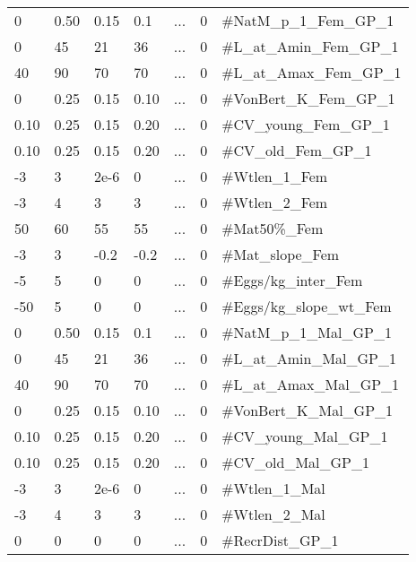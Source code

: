 \begin{longtable}{p{1.1cm} p{1.1cm} p{1.1cm}  p{1.1cm}  p{1.5cm}  p{1.1cm}  p{6.75cm}  }
	0    & 0.50 & 0.15 & 0.1  & \multicolumn{1}{c}{...} & 0 & \#NatM\_p\_1\_Fem\_GP\_1\Tstrut\\
	0    & 45   & 21   & 36   & \multicolumn{1}{c}{...} & 0 & \#L\_at\_Amin\_Fem\_GP\_1 \\
	40   & 90   & 70   & 70   & \multicolumn{1}{c}{...} & 0 & \#L\_at\_Amax\_Fem\_GP\_1 \\
	0    & 0.25 & 0.15 & 0.10 & \multicolumn{1}{c}{...} & 0 & \#VonBert\_K\_Fem\_GP\_1 \\
	0.10 & 0.25 & 0.15 & 0.20 & \multicolumn{1}{c}{...} & 0 & \#CV\_young\_Fem\_GP\_1 \\
	0.10 & 0.25 & 0.15 & 0.20 & \multicolumn{1}{c}{...} & 0 & \#CV\_old\_Fem\_GP\_1 \\
	-3   & 3    & 2e-6 & 0    & \multicolumn{1}{c}{...} & 0 & \#Wtlen\_1\_Fem \\
	-3   & 4    & 3    & 3    & \multicolumn{1}{c}{...} & 0 & \#Wtlen\_2\_Fem \\
	50   & 60   & 55   & 55   & \multicolumn{1}{c}{...} & 0 & \#Mat50\%\_Fem  \\
	-3   & 3    & -0.2 & -0.2 & \multicolumn{1}{c}{...} & 0 & \#Mat\_slope\_Fem \\
	-5   & 5    & 0    & 0    & \multicolumn{1}{c}{...} & 0 & \#Eggs/kg\_inter\_Fem \\
	-50  & 5    & 0    & 0    & \multicolumn{1}{c}{...} & 0 & \#Eggs/kg\_slope\_wt\_Fem \\
	0    & 0.50 & 0.15 & 0.1  & \multicolumn{1}{c}{...} & 0 & \#NatM\_p\_1\_Mal\_GP\_1\\
	0    & 45   & 21   & 36   & \multicolumn{1}{c}{...} & 0 & \#L\_at\_Amin\_Mal\_GP\_1 \\
	40   & 90   & 70   & 70   & \multicolumn{1}{c}{...} & 0 & \#L\_at\_Amax\_Mal\_GP\_1 \\
	0    & 0.25 & 0.15 & 0.10 & \multicolumn{1}{c}{...} & 0 & \#VonBert\_K\_Mal\_GP\_1 \\
	0.10 & 0.25 & 0.15 & 0.20 & \multicolumn{1}{c}{...} & 0 & \#CV\_young\_Mal\_GP\_1 \\
	0.10 & 0.25 & 0.15 & 0.20 & \multicolumn{1}{c}{...} & 0 & \#CV\_old\_Mal\_GP\_1 \\
	-3   & 3    & 2e-6 & 0    & \multicolumn{1}{c}{...} & 0 & \#Wtlen\_1\_Mal \\
	-3   & 4    & 3    & 3    & \multicolumn{1}{c}{...} & 0 & \#Wtlen\_2\_Mal \\
	 0   & 0    & 0    & 0    & \multicolumn{1}{c}{...} & 0 & \#RecrDist\_GP\_1 \\

\end{longtable}
